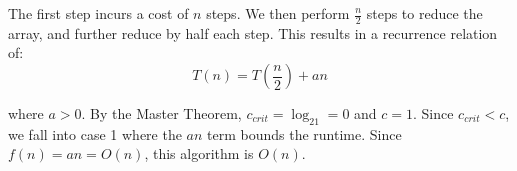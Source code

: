\documentclass{article}
\begin{document}
\begin{enumerate}
\begin{enumerate}
\begin{enumerate}
                        \hfill \break
                        The first step incurs a cost of $n$ steps. We then perform $\frac{n}{2}$ steps
                        to reduce the array, and further reduce by half each step. This results in a 
                        recurrence relation of:
                        \begin{equation*}
                            T\left(n\right) = T\left(\frac{n}{2}\right) + an
                        \end{equation*}
                        
                        where $a > 0$. By the Master Theorem, $c_{crit} = \log_21 = 0$ and $c = 1$.
                        Since $c_{crit} < c$, we fall into case 1 where the $an$ term bounds the runtime. 
                        Since $ f\left(n\right)= an = O\left(n\right)$, this algorithm is $O\left(n\right)$.
                \end{enumerate}
        \end{enumerate}
\end{enumerate}
\end{document}
